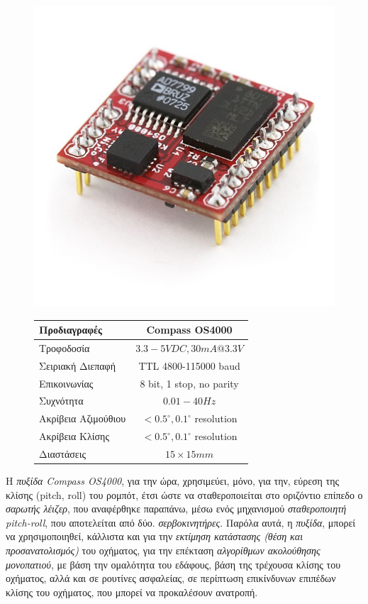 \begin{enumerate}
\begin{figure}[!ht]
	\begin{minipage}[b]{0.45\textwidth}
		\centering
		\includegraphics[width=0.5\linewidth]{Chapters/Chapter2/Figures/compassOS4000.jpg}
		\label{fig:compassOS4000}
	\end{minipage}		
	\begin{minipage}[b]{0.54\textwidth}
		\centering
		\begin{tabular}{| l | c |}
			\hline
			\textbf{Προδιαγραφές} & \textbf{Compass OS4000}\\ \hline
			Τροφοδοσία & $3.3-5VDC, 30mA @ 3.3V$\\ \hline
			Σειριακή Διεπαφή& TTL 4800-115000 baud\\
			Επικοινωνίας  & 8 bit, 1 stop, no parity\\ \hline
			Συχνότητα & $0.01-40Hz$\\ \hline
			Ακρίβεια Αζιμούθιου & $<0.5^{\circ}, 0.1^{\circ}$ resolution\\ \hline
			Ακρίβεια Κλίσης & $<0.5^{\circ}, 0.1^{\circ}$ resolution\\ \hline
			Διαστάσεις & $15 \times 15 mm$\\ \hline
		\end{tabular}
		\label{tab:compassOS4000}
	\end{minipage}
\end{figure}

Η \textit{πυξίδα Compass OS4000}, για την ώρα, χρησιμεύει, μόνο, για την, εύρεση της κλίσης (pitch, roll) του ρομπότ, έτσι ώστε να σταθεροποιείται στο οριζόντιο επίπεδο ο \textit{σαρωτής λέιζερ}, που αναφέρθηκε παραπάνω, μέσω ενός μηχανισμού \textit{σταθεροποιητή pitch-roll}, που αποτελείται από δύο. \textit{σερβοκινητήρες}. Παρόλα αυτά, η \textit{πυξίδα}, μπορεί να χρησιμοποιηθεί, κάλλιστα και για την \textit{εκτίμηση κατάστασης (θέση και προσανατολισμός)} του οχήματος, για την επέκταση \textit{αλγορίθμων ακολούθησης μονοπατιού}, με βάση την ομαλότητα του εδάφους, βάση της τρέχουσα κλίσης του οχήματος, αλλά και σε ρουτίνες ασφαλείας, σε περίπτωση επικίνδυνων επιπέδων κλίσης του οχήματος, που μπορεί να προκαλέσουν ανατροπή.


\end{enumerate}
